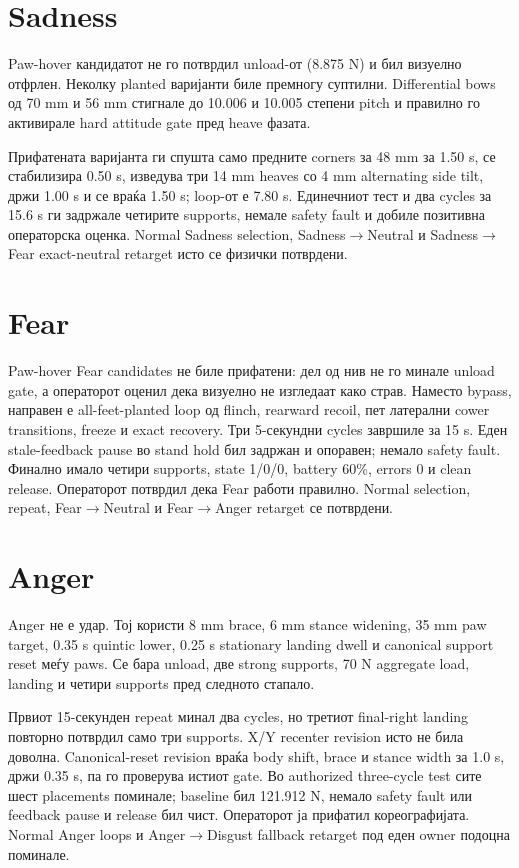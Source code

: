 \section{Sadness}

Paw-hover кандидатот не го потврдил unload-от (8.875 N) и бил визуелно
отфрлен. Неколку planted варијанти биле премногу суптилни. Differential bows
од 70 mm и 56 mm стигнале до 10.006 и 10.005 степени pitch и правилно го
активирале hard attitude gate пред heave фазата.

Прифатената варијанта ги спушта само предните corners за 48 mm за 1.50 s,
се стабилизира 0.50 s, изведува три 14 mm heaves со 4 mm alternating side tilt,
држи 1.00 s и се враќа 1.50 s; loop-от е 7.80 s. Единечниот тест и два cycles
за 15.6 s ги задржале четирите supports, немале safety fault и добиле позитивна
операторска оценка. Normal Sadness selection, Sadness$\rightarrow$Neutral и
Sadness$\rightarrow$Fear exact-neutral retarget исто се физички потврдени.

\section{Fear}

Paw-hover Fear candidates не биле прифатени: дел од нив не го минале unload
gate, а операторот оценил дека визуелно не изгледаат како страв. Наместо
bypass, направен е all-feet-planted loop од flinch, rearward recoil, пет
латерални cower transitions, freeze и exact recovery. Три 5-секундни cycles
завршиле за 15 s. Еден stale-feedback pause во stand hold бил задржан и
опоравен; немало safety fault. Финално имало четири supports, state 1/0/0,
battery 60\%, errors 0 и clean release. Операторот потврдил дека Fear работи
правилно. Normal selection, repeat, Fear$\rightarrow$Neutral и
Fear$\rightarrow$Anger retarget се потврдени.

\section{Anger}

Anger не е удар. Тој користи 8 mm brace, 6 mm stance widening, 35 mm paw target,
0.35 s quintic lower, 0.25 s stationary landing dwell и canonical support reset
меѓу paws. Се бара unload, две strong supports, 70 N aggregate load, landing и
четири supports пред следното стапало.

Првиот 15-секунден repeat минал два cycles, но третиот final-right landing
повторно потврдил само три supports. X/Y recenter revision исто не била
доволна. Canonical-reset revision враќа body shift, brace и stance width за 1.0
s, држи 0.35 s, па го проверува истиот gate. Во authorized three-cycle test
сите шест placements поминале; baseline бил 121.912 N, немало safety fault или
feedback pause и release бил чист. Операторот ја прифатил кореографијата.
Normal Anger loops и Anger$\rightarrow$Disgust fallback retarget под еден owner
подоцна поминале.

